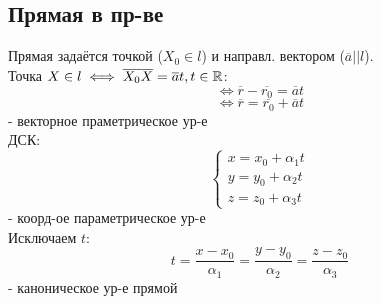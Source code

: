 \subsection{Прямая в пр-ве}
Прямая задаётся точкой ($X_0 \in l$) и направл. вектором ($\overline{a} || l$). \\

Точка $X \in l \iff \overline{X_0X} = \overline{a} t, t \in \mathbb{R}$:
\[
  \iff \overline{r} - \overline{r_0} = \overline{a}t
\]
\begin{equation}
  \iff \overline{r} = \overline{r_0} + \overline{a}t
\end{equation}
- векторное праметрическое ур-е \\

ДСК:
\begin{equation}
\begin{cases}
x = x_0 + \alpha_1 t \\
y = y_0 + \alpha_2 t \\
z = z_0 + \alpha_3 t
\end{cases}
\end{equation}
- коорд-ое параметрическое ур-е \\

Исключаем $t$:
\begin{equation}
t = \frac{x - x_0}{\alpha_1} = \frac{y - y_0}{\alpha_2} = \frac{z - z_0}{\alpha_3}
\end{equation}
 - каноническое ур-е прямой \\

